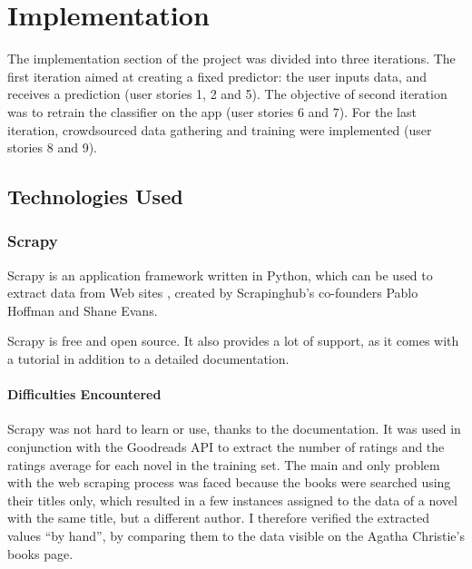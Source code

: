 \documentclass{mproj}
\begin{document}
\chapter{Implementation}\label{implementation}

The implementation section of the project was divided into three iterations. 
The first iteration aimed at creating a fixed predictor: the user inputs data, and receives a prediction (user stories 1, 2 and 5). 
The objective of second iteration was to retrain the classifier on the app (user stories 6 and 7). 
For the last iteration, crowdsourced data gathering and training were implemented (user stories 8 and 9). \par

\section{Technologies Used}

\subsection{Scrapy}\label{scrapy}

Scrapy is an application framework written in Python, which can be used to extract data from Web sites \cite{scrapy}, created by Scrapinghub's co-founders Pablo Hoffman and Shane Evans. \cite{scrapinghub}

Scrapy is free and open source. It also provides a lot of support, as it comes with a tutorial in addition to a detailed documentation. \cite{scrapydoc}

\subsubsection*{Difficulties Encountered}

Scrapy was not hard to learn or use, thanks to the documentation. It was used in conjunction with the Goodreads API \cite{goodreadsapi} to extract the number of ratings and the ratings average for each novel in the training set. The main and only problem with the web scraping process was faced because the books were searched using their titles only, which resulted in a few instances assigned to the data of a novel with the same title, but a different author. I therefore verified the extracted values ``by hand'', by comparing them to the data visible on the Agatha Christie's books page. \cite{goodreads}
\end{document}
